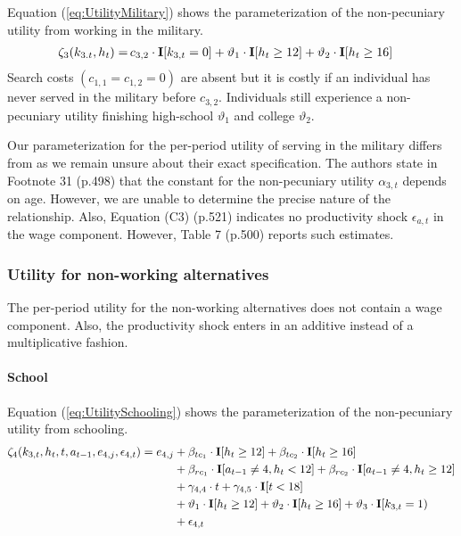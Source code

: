 \noindent Equation (\ref{eq:UtilityMilitary}) shows the parameterization of the non-pecuniary utility from working in the military.
%
\begin{align}\label{eq:UtilityMilitary}
\zeta_{3}( k_{3.t}, h_t)  = \,& c_{3,2} \cdot {\textbf{I}}[k_{3,t} = 0]+ \vartheta_1 \cdot {\textbf{I}}[h_t \geq 12] + \vartheta_2 \cdot {\textbf{I}}[h_t \geq 16]
\end{align}
%
Search costs $(c_{1, 1} = c_{1, 2} = 0)$ are absent but it is costly if an individual has never served in the military before $c_{3,2}$. Individuals still experience a non-pecuniary utility finishing high-school $\vartheta_1$ and college $\vartheta_2$.


\begin{Remark} Our parameterization for the per-period utility of serving in the military differs from \citet{Keane.1997} as we remain unsure about their exact specification. The authors state in Footnote 31 (p.498) that the constant for the non-pecuniary utility $\alpha_{3,t}$ depends on age. However, we are unable to determine the precise nature of the relationship. Also, Equation (C3) (p.521) indicates no productivity shock $\epsilon_{a,t}$ in the wage component. However, Table 7 (p.500) reports such estimates.
\end{Remark}
\FloatBarrier\subsubsection*{Utility for non-working alternatives}
The per-period utility for the non-working alternatives does not contain a wage component. Also, the productivity shock enters in an additive instead of a multiplicative fashion.
\FloatBarrier\paragraph*{School}
Equation (\ref{eq:UtilitySchooling}) shows the parameterization of the non-pecuniary utility from schooling.
%
\begin{align}\label{eq:UtilitySchooling}
	\zeta_4(k_{3,t}, h_t, t, a_{t-1}, e_{4,j}, \epsilon_{4,t})  = e_{4,j} & + \beta_{tc_1} \cdot {\textbf{I}}[h_t \geq 12] + \beta_{tc_2} \cdot {\textbf{I}}[h_t \geq 16]   \\\nonumber
    							  & + \beta_{rc_1} \cdot {\textbf{I}}[a_{t-1} \neq 4, h_t < 12] + \beta_{rc_2} \cdot {\textbf{I}}[a_{t-1} \neq 4, h_t \geq 12] \\\nonumber
    							  & + \gamma_{4,4} \cdot t + \gamma_{4,5} \cdot {\textbf{I}}[t < 18] 																					  \\\nonumber
     							  & + \vartheta_1 \cdot {\textbf{I}}[h_t \geq 12] + \vartheta_2 \cdot {\textbf{I}}[h_t \geq 16] + \vartheta_3 \cdot {\textbf{I}}[k_{3,t} = 1)\\\nonumber
      							& + \epsilon_{4,t}
\end{align}
